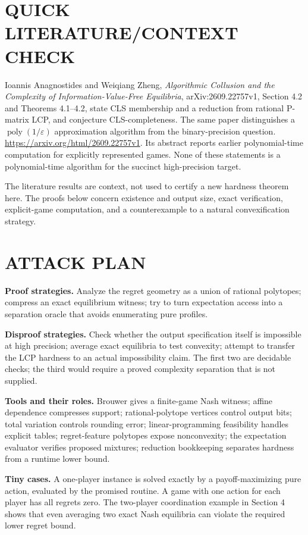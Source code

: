 \documentclass[11pt,a4paper]{article}
\theoremstyle{definition}\newtheorem{definition}[theorem]{Definition}
\theoremstyle{remark}\newtheorem{remark}[theorem]{Remark}
\newcommand{\1}{\mathbf 1}
\begin{document}
\section{QUICK LITERATURE/CONTEXT CHECK}
Ioannis Anagnostides and Weiqiang Zheng, \emph{Algorithmic Collusion and the Complexity of Information-Value-Free Equilibria}, arXiv:2609.22757v1, Section 4.2 and Theorems 4.1--4.2, state CLS membership and a reduction from rational P-matrix LCP, and conjecture CLS-completeness. The same paper distinguishes a $\operatorname{poly}(1/\varepsilon)$ approximation algorithm from the binary-precision question. \url{https://arxiv.org/html/2609.22757v1}. Its abstract reports earlier polynomial-time computation for explicitly represented games. None of these statements is a polynomial-time algorithm for the succinct high-precision target.

The literature results are context, not used to certify a new hardness theorem here. The proofs below concern existence and output size, exact verification, explicit-game computation, and a counterexample to a natural convexification strategy.

\section{ATTACK PLAN}
\textbf{Proof strategies.} Analyze the regret geometry as a union of rational polytopes; compress an exact equilibrium witness; try to turn expectation access into a separation oracle that avoids enumerating pure profiles.

\textbf{Disproof strategies.} Check whether the output specification itself is impossible at high precision; average exact equilibria to test convexity; attempt to transfer the LCP hardness to an actual impossibility claim. The first two are decidable checks; the third would require a proved complexity separation that is not supplied.

\textbf{Tools and their roles.} Brouwer gives a finite-game Nash witness; affine dependence compresses support; rational-polytope vertices control output bits; total variation controls rounding error; linear-programming feasibility handles explicit tables; regret-feature polytopes expose nonconvexity; the expectation evaluator verifies proposed mixtures; reduction bookkeeping separates hardness from a runtime lower bound.

\textbf{Tiny cases.} A one-player instance is solved exactly by a payoff-maximizing pure action, evaluated by the promised routine. A game with one action for each player has all regrets zero. The two-player coordination example in Section 4 shows that even averaging two exact Nash equilibria can violate the required lower regret bound.
\end{document}
